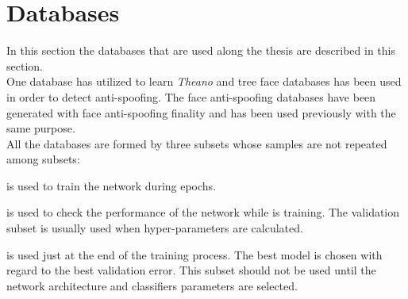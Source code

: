 \section{Databases}
In this section the databases that are used along the thesis are described in this section.\\

One database has utilized to learn \textit{Theano} and tree face databases has been used in order to detect anti-spoofing. The face anti-spoofing databases have been generated with face anti-spoofing finality and has been used previously with the same purpose.\\

All the databases are formed by three subsets whose samples are not repeated among subsets:
\begin{description}[itemsep=2pt,topsep=8pt,parsep=0pt,partopsep=20pt]
\item[Training subset:] is used to train the network during epochs.
\item[Validation subset:] is used to check the performance of the network while is training. The validation subset is usually used when hyper-parameters are calculated.
\item[Test subset:] is used just at the end of the training process. The best model is chosen with regard to the best validation error. This subset should not be used until the network architecture and classifiers parameters are selected.
\end{description}

